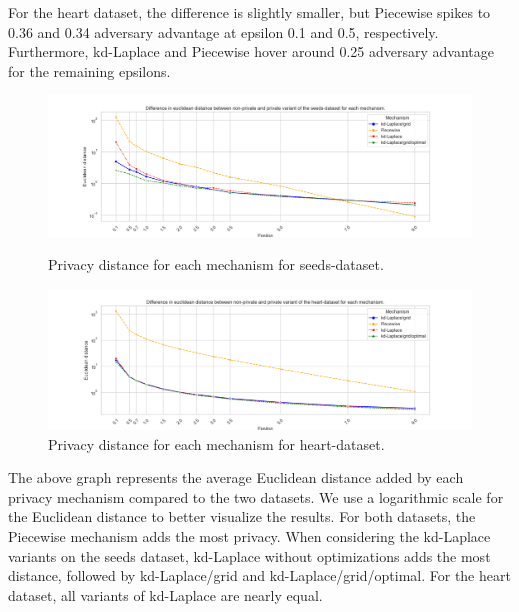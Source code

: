 For the heart dataset, the difference is slightly smaller, but Piecewise spikes to 0.36 and 0.34 adversary advantage at epsilon 0.1 and 0.5, respectively. Furthermore, kd-Laplace and Piecewise hover around 0.25 adversary advantage for the remaining epsilons.
\newpage
\begin{figure}[H]
    \centering
    \begin{minipage}[c]{\textwidth}
        \includegraphics[width=\textwidth]{Results/RQ1/seeds-dataset/privacy_distance_plot.png}
        \caption{Privacy distance for each mechanism for seeds-dataset.}
        \label{fig:privacy_seeds-dataset_comparison_2d_privacy_distance_plot}
    \end{minipage}
    \begin{minipage}[c]{\textwidth}
        \includegraphics[width=\textwidth]{Results/RQ1/heart-dataset/privacy_distance_plot.png}
        \caption{Privacy distance for each mechanism for heart-dataset.}
        \label{fig:privacy_heart-dataset_comparison_2d_privacy_distance_plot}
    \end{minipage}
\end{figure}
The above graph represents the average Euclidean distance added by each privacy mechanism compared to the two datasets. We use a logarithmic scale for the Euclidean distance to better visualize the results.
For both datasets, the Piecewise mechanism adds the most privacy. When considering the kd-Laplace variants on the seeds dataset, kd-Laplace without optimizations adds the most distance, followed by kd-Laplace/grid and kd-Laplace/grid/optimal. For the heart dataset, all variants of kd-Laplace are nearly equal.
\newpage
